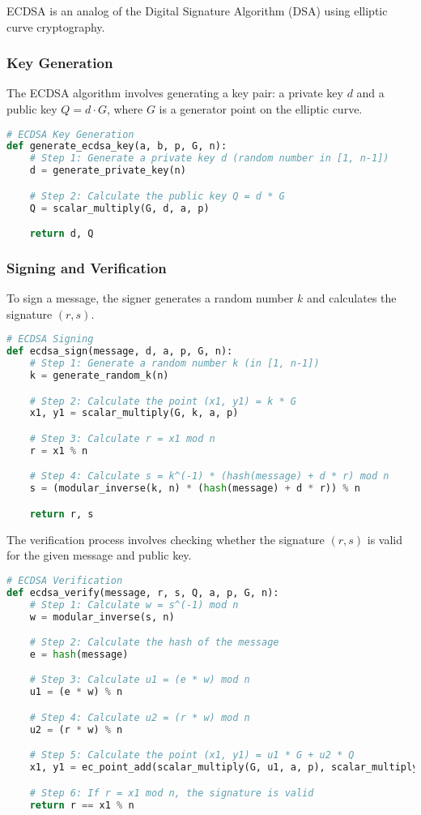 \documentclass{article}
\begin{document}
ECDSA is an analog of the Digital Signature Algorithm (DSA) using elliptic curve cryptography.

\subsubsection{Key Generation}

The ECDSA algorithm involves generating a key pair: a private key $d$ and a public key $Q = d \cdot G$, where $G$ is a generator point on the elliptic curve.

\begin{lstlisting}[language=Python]
# ECDSA Key Generation
def generate_ecdsa_key(a, b, p, G, n):
    # Step 1: Generate a private key d (random number in [1, n-1])
    d = generate_private_key(n)

    # Step 2: Calculate the public key Q = d * G
    Q = scalar_multiply(G, d, a, p)

    return d, Q
\end{lstlisting}

\subsubsection{Signing and Verification}

To sign a message, the signer generates a random number $k$ and calculates the signature $(r, s)$.

\begin{lstlisting}[language=Python]
# ECDSA Signing
def ecdsa_sign(message, d, a, p, G, n):
    # Step 1: Generate a random number k (in [1, n-1])
    k = generate_random_k(n)

    # Step 2: Calculate the point (x1, y1) = k * G
    x1, y1 = scalar_multiply(G, k, a, p)

    # Step 3: Calculate r = x1 mod n
    r = x1 % n

    # Step 4: Calculate s = k^(-1) * (hash(message) + d * r) mod n
    s = (modular_inverse(k, n) * (hash(message) + d * r)) % n

    return r, s
\end{lstlisting}

The verification process involves checking whether the signature $(r, s)$ is valid for the given message and public key.

\begin{lstlisting}[language=Python]
# ECDSA Verification
def ecdsa_verify(message, r, s, Q, a, p, G, n):
    # Step 1: Calculate w = s^(-1) mod n
    w = modular_inverse(s, n)

    # Step 2: Calculate the hash of the message
    e = hash(message)

    # Step 3: Calculate u1 = (e * w) mod n
    u1 = (e * w) % n

    # Step 4: Calculate u2 = (r * w) mod n
    u2 = (r * w) % n

    # Step 5: Calculate the point (x1, y1) = u1 * G + u2 * Q
    x1, y1 = ec_point_add(scalar_multiply(G, u1, a, p), scalar_multiply(Q, u2, a, p), a, p)

    # Step 6: If r = x1 mod n, the signature is valid
    return r == x1 % n
\end{lstlisting}
\end{document}
